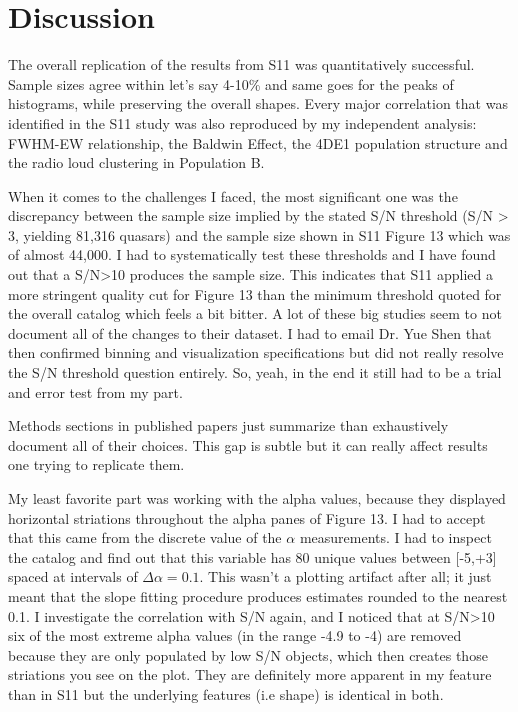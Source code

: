 \documentclass[11pt,a4paper]{article}
\begin{document}
\section{Discussion}

The overall replication of the results from S11 was quantitatively successful. Sample sizes agree within let's say 4-10\% and same goes for the peaks of histograms, while preserving the overall shapes. Every major correlation that was identified in the S11 study was also reproduced by my independent analysis: FWHM-EW relationship, the Baldwin Effect, the 4DE1 population structure and the radio loud clustering in Population B. 

When it comes to the challenges I faced, the most significant one was the discrepancy between the sample size implied by the stated S/N threshold (S/N > 3, yielding 81,316 quasars) and the sample size shown in S11 Figure 13 which was of almost 44,000. I had to systematically test these thresholds and I have found out that a S/N>10 produces the sample size. This indicates that S11 applied a more stringent quality cut for Figure 13 than the minimum threshold quoted for the overall catalog which feels a bit bitter. A lot of these big studies seem to not document all of the changes to their dataset. I had to email Dr. Yue Shen that then confirmed binning and visualization specifications but did not really resolve the S/N threshold question entirely. So, yeah, in the end it still had to be a trial and error test from my part.

Methods sections in published papers just summarize than exhaustively document all of their choices. This gap is subtle but it can really affect results one trying to replicate them.

My least favorite part was working with the alpha values, because they displayed horizontal striations throughout the alpha panes of Figure 13. I had to accept that this came from the discrete value of the $\alpha$ measurements. I had to inspect the catalog and find out that this variable has 80 unique values between [-5,+3] spaced at intervals of $\Delta\alpha = 0.1$. This wasn't a plotting artifact after all; it just meant that the slope fitting procedure produces estimates rounded to the nearest 0.1. I investigate the correlation with S/N again, and I noticed that at S/N>10 six of the most extreme alpha values (in the range -4.9 to -4) are removed because they are only populated by low S/N objects, which then creates those striations you see on the plot. They are definitely more apparent in my feature than in S11 but the underlying features (i.e shape) is identical in both.
\end{document}
